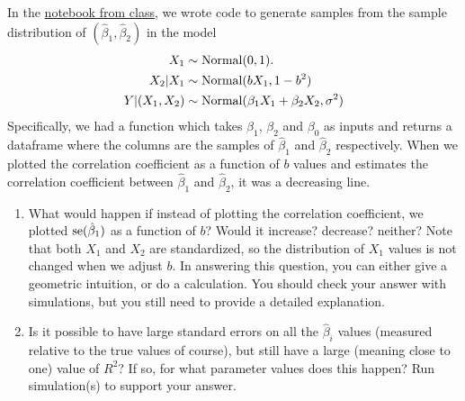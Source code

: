 \begin{exercise}\label{ex:sampledist}
In the \href{https://colab.research.google.com/drive/1oIRgP_7-c5DGV1D2iz5nj406mZfJxUIG?usp=sharing}{notebook from class}, we wrote code to generate samples from the sample distribution of $(\hat{\beta}_1,\hat{\beta}_2)$ in the model 
\begin{align*}
X_1 &\sim {\rm Normal}(0,1). \\
X_2|X_1 &\sim {\rm Normal}(bX_1,1-b^2)\\
Y|(X_1,X_2) &\sim {\rm Normal}( \beta_1X_1 + \beta_2X_2,\sigma^2) 
\end{align*} 
Specifically, we had a function which takes $\beta_1$, $\beta_2$ and $\beta_0$ as inputs and returns a dataframe where the columns are the samples of $\hat{\beta}_1$ and $\hat{\beta}_2$ respectively. When we plotted the correlation coefficient as a function of $b$ values and estimates the correlation coefficient between $\hat{\beta}_1$ and $\hat{\beta}_2$, it was a decreasing line. 
\begin{enumerate}[label=(\alph*)]
\item What would happen if instead of plotting the correlation coefficient, we plotted ${\rm se}(\hat{\beta}_1)$ as a function of $b$? Would it increase? decrease? neither? Note that both $X_1$ and $X_2$ are standardized, so the distribution of $X_1$ values is not changed when we adjust $b$. In answering this question, you can either give a geometric intuition, or do a calculation. You should check your answer with simulations, but you still need to provide a detailed explanation. 
\item Is it possible to have large standard errors on all the $\hat{\beta}_i$ values (measured relative to the true values of course), but still have a large (meaning close to one) value of $R^2$? If so, for what parameter values does this happen? Run simulation(s) to support your answer. 
\end{enumerate}

\end{exercise}




 





